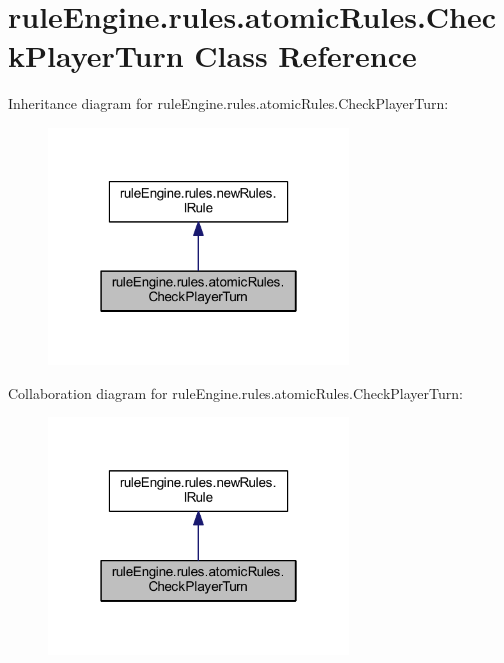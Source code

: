 \hypertarget{classrule_engine_1_1rules_1_1atomic_rules_1_1_check_player_turn}{}\section{rule\+Engine.\+rules.\+atomic\+Rules.\+Check\+Player\+Turn Class Reference}
\label{classrule_engine_1_1rules_1_1atomic_rules_1_1_check_player_turn}


Inheritance diagram for rule\+Engine.\+rules.\+atomic\+Rules.\+Check\+Player\+Turn\+:
\nopagebreak
\begin{figure}[H]
\begin{center}
\leavevmode
\includegraphics[width=226pt]{classrule_engine_1_1rules_1_1atomic_rules_1_1_check_player_turn__inherit__graph}
\end{center}
\end{figure}


Collaboration diagram for rule\+Engine.\+rules.\+atomic\+Rules.\+Check\+Player\+Turn\+:
\nopagebreak
\begin{figure}[H]
\begin{center}
\leavevmode
\includegraphics[width=226pt]{classrule_engine_1_1rules_1_1atomic_rules_1_1_check_player_turn__coll__graph}
\end{center}
\end{figure}
